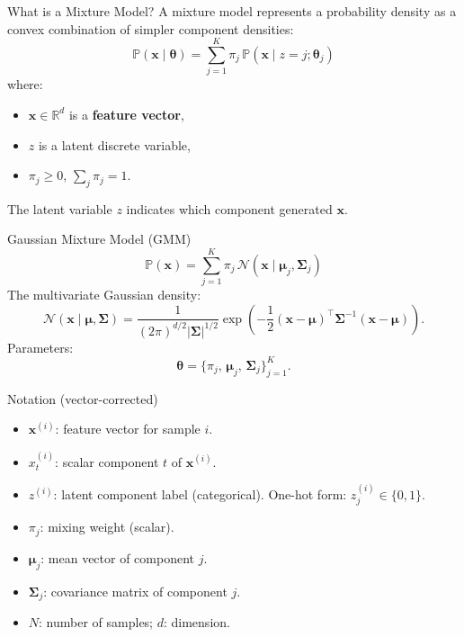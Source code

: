 \documentclass[serif, aspectratio=169]{beamer}
\begin{document}
\begin{frame}{What is a Mixture Model?}
A mixture model represents a probability density as a convex combination of simpler component densities:
\[
\mathbb{P}(\mathbf{x}\mid\boldsymbol{\theta})
=
\sum_{j=1}^{K} \pi_j \, 
\mathbb{P}(\mathbf{x} \mid z=j; \boldsymbol{\theta}_j)
\]
where:
\begin{itemize}
    \item \(\mathbf{x} \in \mathbb{R}^d\) is a \textbf{feature vector},
    \item \(z\) is a latent discrete variable,
    \item \(\pi_j \ge 0\), \(\sum_j \pi_j = 1\).
\end{itemize}
The latent variable \(z\) indicates which component generated \(\mathbf{x}\).
\end{frame}

\begin{frame}{Gaussian Mixture Model (GMM)}
\[
\mathbb{P}(\mathbf{x})
=
\sum_{j=1}^{K} \pi_j \,
\mathcal{N}(\mathbf{x}\mid\mathbf{\mu}_j,\mathbf{\Sigma}_j)
\]
The multivariate Gaussian density:
\[
\mathcal{N}(\mathbf{x} \mid \mathbf{\mu}, \mathbf{\Sigma})
=
\frac{1}{(2\pi)^{d/2}
\lvert\mathbf{\Sigma}\rvert^{1/2}}
\exp\!\left(
    -\frac{1}{2}(\mathbf{x}-\mathbf{\mu})^\top 
    \mathbf{\Sigma}^{-1}(\mathbf{x}-\mathbf{\mu})
\right).
\]
Parameters:
\[
\boldsymbol{\theta}
=
\{\pi_j,\, \mathbf{\mu}_j,\, \mathbf{\Sigma}_j\}_{j=1}^K.
\]
\end{frame}

\begin{frame}{Notation (vector-corrected)}
\begin{itemize}
    \item \(\mathbf{x}^{(i)}\): feature vector for sample \(i\).
    \item \(x^{(i)}_t\): scalar component \(t\) of \(\mathbf{x}^{(i)}\).
    \item \(z^{(i)}\): latent component label (categorical).  
          One-hot form: \(z^{(i)}_j \in \{0,1\}\).
    \item \(\pi_j\): mixing weight (scalar).
    \item \(\mathbf{\mu}_j\): mean vector of component \(j\).
    \item \(\mathbf{\Sigma}_j\): covariance matrix of component \(j\).
    \item \(N\): number of samples; \(d\): dimension.
\end{itemize}
\end{frame}
\end{document}
